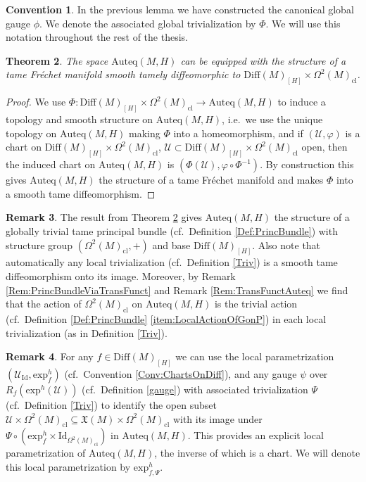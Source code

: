 \documentclass[12pt,a4paper]{article}
\theoremstyle{plain}
\newtheorem{theorem}{Theorem}[subsection]
\theoremstyle{definition}
\newtheorem{remark}[theorem]{Remark}
\newtheorem{convention}[theorem]{Convention}
\newcommand{\VFs}{\mathfrak{X}(M)}
\newcommand{\Forms}[1]{\Omega^{#1}(M)}
\newcommand{\ClForms}[1]{\Forms{#1}_{\mathrm{cl}}}
\newcommand{\SDiff}{\mathrm{Diff}(M)_{[H]}}
\newcommand{\Auteq}{\mathrm{Auteq}(M,H)}
\newcommand{\eh}[1]{\mathrm{exp}^h(#1)}
\newcommand{\exh}{\mathrm{exp}^h}
\newcommand{\Id}{\mathrm{Id}}
\newcommand{\Ucal}{\mathcal{U}}
\begin{document}
\begin{convention}
\label{Phi,phi}
In the previous lemma we have constructed the canonical global gauge $\phi$.
We denote the associated global trivialization by $\Phi$. We will use this notation throughout the rest of the thesis.  
\end{convention}

\begin{theorem}
\label{Thm:AuteqTameMfd}
The space $\Auteq$ can be equipped with the structure of a tame Fréchet manifold smooth tamely diffeomorphic to $\SDiff\times \ClForms{2}$.
\end{theorem}
\begin{proof}
We use $\Phi:\SDiff\times \ClForms{2}\to \Auteq$ to induce a topology and smooth structure on $\Auteq$, i.e.~we use the unique topology on $\Auteq$ making $\Phi$ into a homeomorphism, and if $(\Ucal,\varphi)$ is a chart on $\SDiff\times \ClForms{2}$,
$\Ucal \subset \SDiff\times \ClForms{2}$ open, then the induced chart on $\Auteq$ is $(\Phi(\Ucal),\varphi\circ\Phi^{-1})$. By construction this gives $\Auteq$ the structure of a tame Fréchet manifold and makes $\Phi$ into a smooth tame diffeomorphism.
\end{proof}



\begin{remark}
The result from Theorem \ref{Thm:AuteqTameMfd} gives $\Auteq$ the structure of a globally trivial tame principal bundle (cf.~Definition \ref{Def:PrincBundle}) with structure group $(\ClForms{2},+)$ and base $\SDiff$. 
Also note that automatically any local trivialization (cf.~Definition \ref{Triv}) is a smooth tame diffeomorphism onto its image.  
Moreover, by Remark \ref{Rem:PrincBundleViaTransFunct} and Remark \ref{Rem:TransFunctAuteq} we find that the action of $\ClForms{2}$ on $\Auteq$ is the trivial action (cf.~Definition \ref{Def:PrincBundle} \ref{item:LocalActionOfGonP}) in each local trivialization (as in Definition \ref{Triv}).
\end{remark}

\begin{remark}
\label{AuteqChart}
For any $f\in \SDiff$ we can use the local parametrization $(\Ucal_{\Id},\exh_f)$ (cf.~Convention \ref{Conv:ChartsOnDiff}), and any gauge $\psi$ over $R_f(\eh{\Ucal})$ (cf.~Definition \ref{gauge}) with associated trivialization $\Psi$ (cf.~Definition \ref{Triv}) to identify the open subset
$\Ucal\times \ClForms{2}\subseteq \VFs\times \ClForms{2}$ with its image under $\Psi\circ (\exh_f\times \mathrm{Id}_{\ClForms{2}})$ in $\Auteq$. This provides an explicit local parametrization of $\Auteq$, the inverse of which is a chart. We will denote this local parametrization by $\exh_{f,\Psi}$.
\end{remark}
\end{document}
